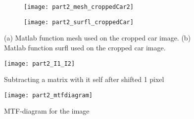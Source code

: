 \begin{figure}[h]
\centering
	\begin{subfigure}[b]{0.4\textwidth}
		\texttt{[image: part2\_mesh\_croppedCar2]}
		\caption{}
		\label{fig:meshCar}
	\end{subfigure}
	\begin{subfigure}[b]{0.4\textwidth}	
		\texttt{[image: part2\_surfl\_croppedCar]}
		\caption{}
		\label{fig:surflCar}
	\end{subfigure}
	\caption{(a) Matlab function mesh used on the cropped car image. (b) Matlab function surfl used on the cropped car image. }
	\label{fig:part2}
\end{figure}
\begin{figure}[h]
	\centering
	\texttt{[image: part2\_I1\_I2]}
	\caption{Subtracting a matrix with it self after shifted 1 pixel}
	\label{fig:I2_I1}
\end{figure}
\begin{figure}[h]
	\centering
	\texttt{[image: part2\_mtfdiagram]}
	\caption{MTF-diagram for the image}
	\label{fig:mtf}
\end{figure}

